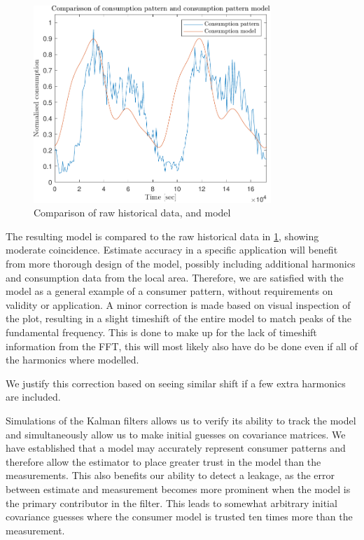 \begin{figure}[h!]
	\centering
	\includegraphics[width=0.8\textwidth]{Pictures/Comparisson.pdf}
	
	\caption{Comparison of raw historical data, and model}
	\label{fig:Comparison}
\end{figure}

The resulting model is compared to the raw historical data in \cref{fig:Comparison}, showing moderate coincidence. Estimate accuracy in a specific application will benefit from more thorough design of the model, possibly including additional harmonics and consumption data from the local area. Therefore, we are satisfied with the model as a general example of a consumer pattern, without requirements on validity or application. A minor correction is made based on visual inspection of the plot, resulting in a slight timeshift of the entire model to match peaks of the fundamental frequency. This is done to make up for the lack of timeshift information from the FFT, this will most likely also have do be done even if all of the harmonics where modelled.


We justify this correction based on seeing similar shift if a few extra harmonics are included.


Simulations of the Kalman filters allows us to verify its ability to track the model and simultaneously allow us to make initial guesses on covariance matrices. We have established that a model may accurately represent consumer patterns and therefore allow the estimator to place greater trust in the model than the measurements. This also benefits our ability to detect a leakage, as the error between estimate and measurement becomes more prominent when the model is the primary contributor in the filter. This leads to somewhat arbitrary initial covariance guesses where the consumer model is trusted ten times more than the measurement.



